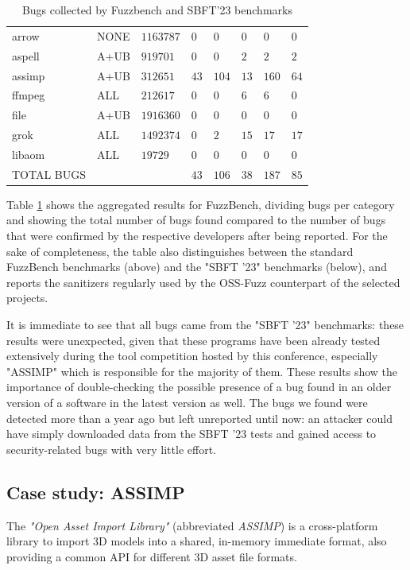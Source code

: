 \begin{table}[h]
{\begin{tabular}{|l|l|l|l|l|l|l|l|}
\hline
arrow   &NONE   &$1163787$   &$0$   &$0$   &$0$   &$0$   &$0$ \\
aspell   &A+UB   &$919701$   &$0$   &$0$   &$2$   &$2$   &$2$ \\
assimp   &A+UB   &$312651$   &$43$   &$104$   &$13$   &$160$   &$64$ \\
ffmpeg   &ALL   &$212617$   &$0$   &$0$   &$6$   &$6$   &$0$ \\
file   &A+UB   &$1916360$   &$0$   &$0$   &$0$   &$0$   &$0$ \\
grok   &ALL   &$1492374$   &$0$   &$2$   &$15$   &$17$   &$17$ \\
libaom   &ALL   &$19729$   &$0$   &$0$   &$0$   &$0$   &$0$ \\
\hline
TOTAL BUGS   &   &   &$43$   &$106$   &$38$   &$187$   &$85$          \\
\hline
\end{tabular}}
\vspace{10pt}
\caption{Bugs collected by Fuzzbench and SBFT'23 benchmarks}
\label{fuzzbench-table}
\end{table}
Table \ref{fuzzbench-table} shows the aggregated results for FuzzBench, dividing bugs per category and showing the total number of bugs found compared to the number of bugs that were confirmed by the respective developers after being reported. For the sake of completeness, the table also distinguishes between the standard FuzzBench benchmarks (above) and the "SBFT '23" benchmarks (below), and reports the sanitizers regularly used by the OSS-Fuzz counterpart of the selected projects.

It is immediate to see that all bugs came from the "SBFT '23" benchmarks: these results were unexpected, given that these programs have been already tested extensively during the tool competition hosted by this conference, especially "ASSIMP" which is responsible for the majority of them. These results show the importance of double-checking the possible presence of a bug found in an older version of a software in the latest version as well. The bugs we found were detected more than a year ago but left unreported until now: an attacker could have simply downloaded data from the SBFT '23 tests and gained access to security-related bugs with very little effort.



\subsection{Case study: ASSIMP}
The \textit{"Open Asset Import Library"} (abbreviated \textit{ASSIMP}) \cite{assimp} is a cross-platform library to import 3D models into a shared, in-memory immediate format, also providing a common API for different 3D asset file formats.

